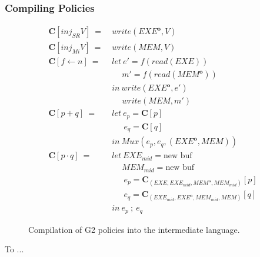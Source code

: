 \documentclass[sigconf,usenames,dvipsnames,svgnames,table]{acmart}
\newcommand{\obf}[1]{#1^\mathbf{o}}
\def \sysname {\textsc{G2}\xspace}
\begin{document}
      \subsubsection{Compiling Policies}\label{sec:comp:comp:pol}
        \begin{figure}
          \begin{align*}
            \mathbf{C}[inj_{SR}V]\ 
              =\ &
              write(\obf{EXE}, V)\\
            \mathbf{C}[inj_{Mi}V]\ 
              =\ &
              write(MEM, V)\\
            \mathbf{C}[f \leftarrow n]\ 
              =\ &
              let\    e' = f(read(EXE))\\
              &\quad\ m' = f(read(\obf{MEM}))\\
              &in\ write(\obf{EXE}, e')\\
              &\quad \ write(MEM, m')\\
            \mathbf{C}[p + q]\ 
              =\ &
              let\      e_p = \mathbf{C}[p]\\
              &\quad\ \ e_q = \mathbf{C}[q]\\
              &in\ Mux(e_p, e_q, (\obf{EXE},MEM))\\
            \mathbf{C}[p \cdot q]\ 
              =\ &
              let\    EXE_{mid} = \text{new buf}\\
              &\quad\ MEM_{mid} = \text{new buf}\\
              &\quad\ \ e_p = \mathbf{C}_{( EXE, EXE_{mid}, \obf{MEM}, MEM_{mid}      )}[p]\\
              &\quad\ \ e_q = \mathbf{C}_{(      EXE_{mid}, \obf{EXE}, MEM_{mid}, MEM )}[q]\\
              &in\ e_p\ ;\ e_q
          \end{align*}
          \caption{Compilation of \sysname policies into the intermediate language.}
          \label{fig:comp:comp:pol}
        \end{figure}





\begin{acks}
To ...
\end{acks}
\end{document}
